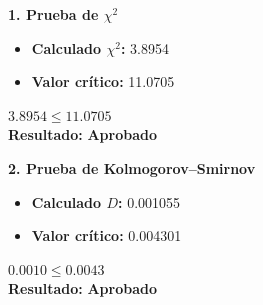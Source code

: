 \noindent
\begin{minipage}[t]{0.48\textwidth}
    \textbf{1. Prueba de \(\chi^2\)}
    \vspace{0.3cm}
    \begin{itemize}[itemsep=0.4em]
        \item \textbf{Calculado \(\chi^2\):} 3.8954
        \item \textbf{Valor crítico:} 11.0705
    \end{itemize}

    \begin{center}
        \vspace{0.5cm}
        \(3.8954 \leq 11.0705\)
        \vspace{0.1cm}
        \\\textbf{Resultado: }
        \textcolor{green!60!black}{\textbf{Aprobado}}
    \end{center}

    \vspace{0.8cm}

    \textbf{2. Prueba de Kolmogorov--Smirnov}
    \vspace{0.3cm}
    \begin{itemize}[itemsep=0.4em]
        \item \textbf{Calculado \(D\):} 0.001055
        \item \textbf{Valor crítico:} 0.004301
    \end{itemize}
    \begin{center}
        \vspace{0.5cm}
        \(0.0010 \leq 0.0043\)
        \vspace{0.1cm}
        \\\textbf{Resultado: }
        \textcolor{green!60!black}{\textbf{Aprobado}}
    \end{center}

\end{minipage}
\hfill
